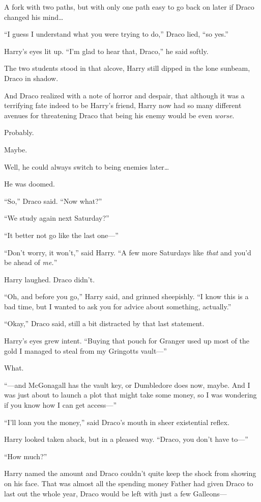 A fork with two paths, but with only one path easy to go back on later if Draco changed his mind…

“I guess I understand what you were trying to do,” Draco lied, “so yes.”

Harry’s eyes lit up. “I’m glad to hear that, Draco,” he said softly.

The two students stood in that alcove, Harry still dipped in the lone sunbeam, Draco in shadow.

And Draco realized with a note of horror and despair, that although it was a terrifying fate indeed to be Harry’s friend, Harry now had so many different avenues for threatening Draco that being his enemy would be even \emph{worse}.

Probably.

Maybe.

Well, he could always switch to being enemies later…

He was doomed.

“So,” Draco said. “Now what?”

“We study again next Saturday?”

“It better not go like the last one—”

“Don’t worry, it won’t,” said Harry. “A few more Saturdays like \emph{that} and you’d be ahead of \emph{me.}”

Harry laughed. Draco didn’t.

“Oh, and before you go,” Harry said, and grinned sheepishly. “I know this is a bad time, but I wanted to ask you for advice about something, actually.”

“Okay,” Draco said, still a bit distracted by that last statement.

Harry’s eyes grew intent. “Buying that pouch for Granger used up most of the gold I managed to steal from my Gringotts vault—”

What.

“—and McGonagall has the vault key, or Dumbledore does now, maybe. And I was just about to launch a plot that might take some money, so I was wondering if you know how I can get access—”

“I’ll loan you the money,” said Draco’s mouth in sheer existential reflex.

Harry looked taken aback, but in a pleased way. “Draco, you don’t have to—”

“How much?”

Harry named the amount and Draco couldn’t quite keep the shock from showing on his face. That was almost all the spending money Father had given Draco to last out the whole year, Draco would be left with just a few Galleons—

